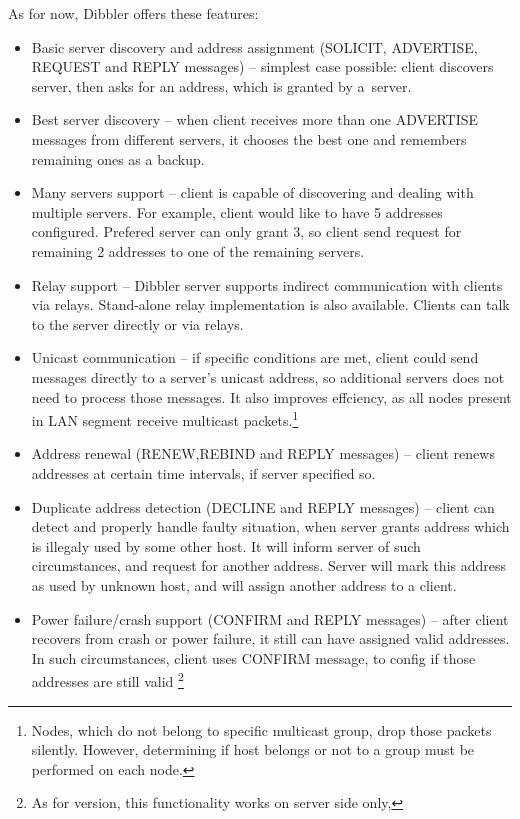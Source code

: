 As for now, Dibbler offers these features:
\begin{itemize}
\item Basic server discovery and address assignment (SOLICIT,
  ADVERTISE, REQUEST and REPLY messages) -- simplest case possible:
  client discovers server, then asks for an address, which is granted
  by a~server.
\item Best server discovery -- when client receives more than one
  ADVERTISE messages from different servers, it chooses the best one
  and remembers remaining ones as a backup.
\item Many servers support -- client is capable of discovering and
  dealing with multiple servers. For example, client would like to
  have 5 addresses configured. Prefered server can only grant 3, so
  client send request for remaining 2 addresses to one of the
  remaining servers.
\item Relay support -- Dibbler server supports indirect
  communication with clients via relays. Stand-alone relay implementation is also
  available. Clients can talk to the server directly or via relays.
\item Unicast communication -- if specific conditions are met, client
  could send messages directly to a server's unicast address, so
  additional servers does not need to process those messages. It also
  improves effciency, as all nodes present in LAN segment receive
  multicast packets.\footnote{Nodes, which do not belong to specific
    multicast group, drop those packets silently. However, determining
    if host belongs or not to a group must be performed on each node.}
\item Address renewal (RENEW,REBIND and REPLY messages) -- client renews
  addresses at certain time intervals, if server specified so.
\item Duplicate address detection (DECLINE and REPLY messages) -- client
  can detect and properly handle faulty situation, when server grants
  address which is illegaly used by some other host. It will inform
  server of such circumstances, and request for another
  address. Server will mark this address as used by unknown host, and
  will assign another address to a client.
\item Power failure/crash support (CONFIRM and REPLY messages) -- after
  client recovers from crash or power failure, it still can have
  assigned valid addresses. In such circumstances, client uses CONFIRM
  message, to config if those addresses are still valid%
  \footnote{As for \version version, this functionality works on server side only,
}
\end{itemize}
